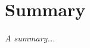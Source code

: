 \documentclass[../main.tex]{subfiles}
\begin{document}
\chapter*{Summary}

\emph{A summary...}
\end{document}
